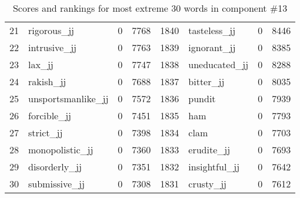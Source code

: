 \begin{table}[tbp]
\begin{tabular}{| rlr@{.}l | rlr@{.}l |}
    21 & rigorous\_jj & 0 & 7768    &    1840 & tasteless\_jj & 0 & 8446 \\
    22 & intrusive\_jj & 0 & 7763    &    1839 & ignorant\_jj & 0 & 8385 \\
    23 & lax\_jj & 0 & 7747    &    1838 & uneducated\_jj & 0 & 8288 \\
    24 & rakish\_jj & 0 & 7688    &    1837 & bitter\_jj & 0 & 8035 \\
    25 & unsportsmanlike\_jj & 0 & 7572    &    1836 & pundit & 0 & 7939 \\
    26 & forcible\_jj & 0 & 7451    &    1835 & ham & 0 & 7793 \\
    27 & strict\_jj & 0 & 7398    &    1834 & clam & 0 & 7703 \\
    28 & monopolistic\_jj & 0 & 7360    &    1833 & erudite\_jj & 0 & 7693 \\
    29 & disorderly\_jj & 0 & 7351    &    1832 & insightful\_jj & 0 & 7642 \\
    30 & submissive\_jj & 0 & 7308    &    1831 & crusty\_jj & 0 & 7612 \\
    \hline
    \end{tabular}
    \caption{Scores and rankings for most extreme 30 words in component \#13} 
\end{table}
\clearpage
